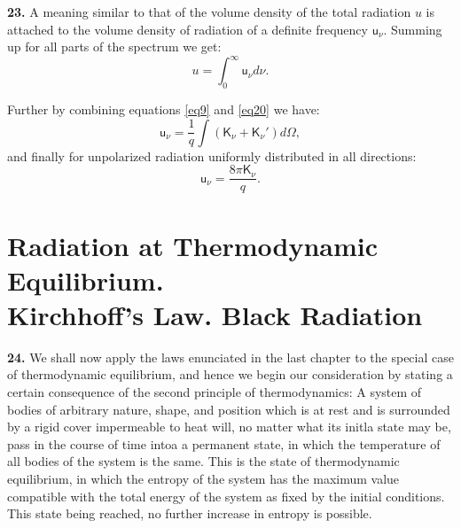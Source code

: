 \documentclass[12pt,oneside]{book}
\begin{document}
\textbf{23.} A meaning similar to that of the volume density of the total radiation $u$ is attached to the volume density of radiation of a definite frequency $\mathsf{u}_\nu$. Summing up for all parts of the spectrum we get:
\begin{equation}
    u=\int_0^\infty\mathsf{u}_\nu d\nu.
    \label{eq22} 
\end{equation} \par 

Further by combining equations \eqref{eq9} and \eqref{eq20} we have: 
\begin{equation}
    \mathsf{u}_\nu=\frac{1}{q}\int(\mathsf{K}_\nu+\mathsf{K}_\nu')d\Omega,
    \label{eq23}
\end{equation}
and finally for unpolarized radiation uniformly distributed in all directions: 
\begin{equation}
    \mathsf{u}_\nu=\frac{8\pi\mathsf{K}_\nu}{q}.
    \label{eq24}
\end{equation} \par 

\chapter[Radiation at Thermodynamic Equilibrium]{Radiation at Thermodynamic Equilibrium.\\ Kirchhoff's Law. Black Radiation}

\textbf{24.} We shall now apply the laws enunciated in the last chapter to the special case of thermodynamic equilibrium, and hence we begin our consideration by stating a certain consequence of the second principle of thermodynamics: A system of bodies of arbitrary nature, shape, and position which is at rest and is surrounded by a rigid cover impermeable to heat will, no matter what its initla state may be, pass in the course of time intoa a permanent state, in which the temperature of all bodies of the system is the same. This is the state of thermodynamic equilibrium, in which the entropy of the system has the maximum value compatible with the total energy of the system as fixed by the initial conditions. This state being reached, no further increase in entropy is possible. \par 
\end{document}
